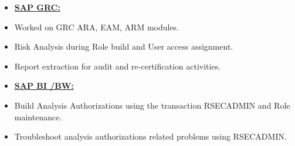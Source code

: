 \documentclass[10pt]{article}
\begin{document}
	\begin{itemize}
		\small
     		\item[] \textbf{\underline{SAP GRC:}} 
        		\item Worked on GRC ARA, EAM, ARM modules.
				\item Risk Analysis during Role build and User access assignment. 
				\item Report extraction for audit and re-certification activities.
	\end{itemize}

	\begin{itemize}
		\small
     		\item[] \textbf{\underline{SAP BI /BW:}} 
        		\item Build Analysis Authorizations using the transaction RSECADMIN and Role maintenance.
				\item Troubleshoot analysis authorizations related problems using RSECADMIN.
	\end{itemize}
\end{document}
